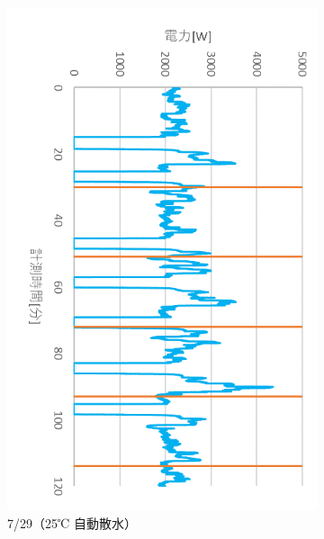 \documentclass[a4j,fleqn,dvipdfmx,uplatex]{jsarticle}
\begin{document}
\begin{figure}[htb]
  \addtocounter{figure}{-1}
  \centering
  \begin{subfigure}[b]{0.4\linewidth}
    \addtocounter{subfigure}{8} %
    \centering
    \includegraphics[width=\linewidth]{img/t_p/20220729.png}
    \caption{7/29（25℃ 自動散水）}
  \end{subfigure}
  \begin{subfigure}[b]{0.4\linewidth}
    \centering

\end{subfigure}
\end{figure}
\end{document}
